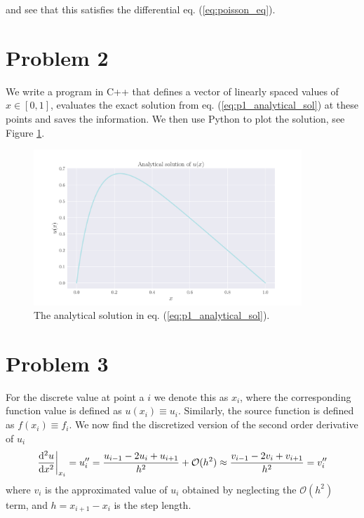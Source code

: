 \documentclass[english,notitlepage,nofootinbib]{revtex4-1}  %
\newcommand{\Fig}[1]{Figure \ref{fig:#1}}
\newcommand{\Eq}[1]{eq. (\ref{eq:#1})}
\begin{document}
and see that this satisfies the differential \Eq{poisson_eq}.


\section*{Problem 2}

We write a program in C++ that defines a vector of linearly spaced values of $x\in[0,1]$, evaluates the exact solution from \Eq{p1_analytical_sol} at these points and saves the information. We then use Python to plot the solution, see \Fig{p1_analytical_sol}.


\begin{figure}[h!]
    \centering
    \includegraphics[width=0.9\textwidth]{ux.pdf}
    \caption{The analytical solution in \Eq{p1_analytical_sol}.}
    \label{fig:p1_analytical_sol}
\end{figure}

\section*{Problem 3}
For the discrete value at point a $i$ we denote this as $x_i$, where the corresponding function value is defined as $u(x_i)\equiv u_i$. Similarly, the source function is defined as $f(x_i)\equiv f_i$. We now find the discretized version of the second order derivative of $u_i$
\begin{align*}
    \dv[2]{u}{x}\bigg\rvert_{x_i} = u_i'' = \frac{u_{i-1}-2u_i+u_{i+1}}{h^2} + \mathcal{O}(h^2) \approx \frac{v_{i-1}-2v_i+v_{i+1}}{h^2} = v_i''
\end{align*}
where $v_i$ is the approximated value of $u_i$ obtained by neglecting the $\mathcal{O}(h^2)$ term, and $h=x_{i+1}-x_i$ is the step length. %
\end{document}
